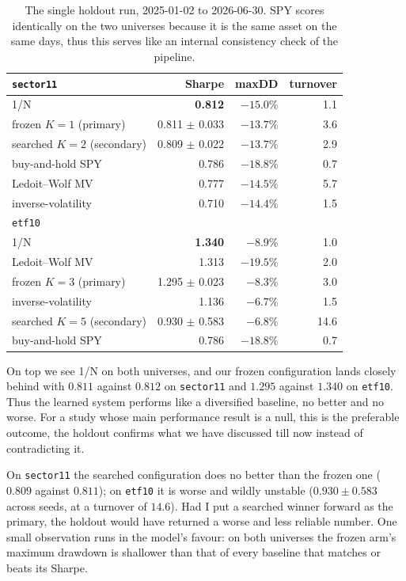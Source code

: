 \begin{table}[t]
  \centering
  \small
  \begin{tabular}{l rrr}
    \hline
    \texttt{sector11} & Sharpe & maxDD & turnover \\
    \hline
    1/N                                  & \textbf{0.812} & $-15.0\%$ & 1.1 \\
    frozen $K{=}1$ (primary)             & 0.811 $\pm$ 0.033 & $-13.7\%$ & 3.6 \\
    searched $K{=}2$ (secondary)         & 0.809 $\pm$ 0.022 & $-13.7\%$ & 2.9 \\
    buy-and-hold SPY                     & 0.786 & $-18.8\%$ & 0.7 \\
    Ledoit--Wolf MV                      & 0.777 & $-14.5\%$ & 5.7 \\
    inverse-volatility                   & 0.710 & $-14.4\%$ & 1.5 \\
    \hline
    \texttt{etf10} & & & \\
    \hline
    1/N                                  & \textbf{1.340} & $-8.9\%$  & 1.0 \\
    Ledoit--Wolf MV                      & 1.313 & $-19.5\%$ & 2.0 \\
    frozen $K{=}3$ (primary)             & 1.295 $\pm$ 0.023 & $-8.3\%$ & 3.0 \\
    inverse-volatility                   & 1.136 & $-6.7\%$  & 1.5 \\
    searched $K{=}5$ (secondary)         & 0.930 $\pm$ 0.583 & $-6.8\%$ & 14.6 \\
    buy-and-hold SPY                     & 0.786 & $-18.8\%$ & 0.7 \\
    \hline
  \end{tabular}
  \caption[The holdout evaluation]{The single holdout run, 2025-01-02 to 2026-06-30. SPY scores identically on the two universes because it is the same asset on the same days, thus this serves like an internal consistency check of the pipeline.}
  \label{tab:holdout}
\end{table}

On top we see 1/N on both universes, and our frozen configuration lands closely behind with $0.811$ against $0.812$ on \texttt{sector11} and $1.295$ against $1.340$ on \texttt{etf10}. Thus the learned system performs like a diversified baseline, no better and no worse. For a study whose main performance result is a null, this is the preferable outcome, the holdout confirms what we have discussed till now instead of contradicting it.

On \texttt{sector11} the searched configuration does no better than the frozen one ($0.809$ against $0.811$); on \texttt{etf10} it is worse and wildly unstable ($0.930 \pm 0.583$ across seeds, at a turnover of $14.6$). Had I put a searched winner forward as the primary, the holdout would have returned a worse and less reliable number. One small observation runs in the model's favour: on both universes the frozen arm's maximum drawdown is shallower than that of every baseline that matches or beats its Sharpe.